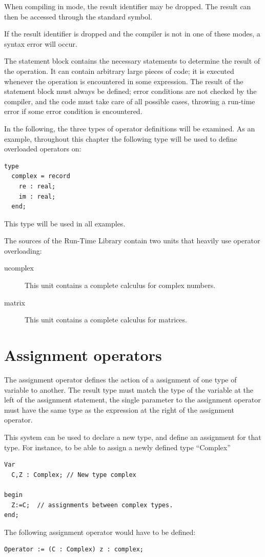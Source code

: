 \begin{remark}
When compiling in  mode, the result identifier may be dropped.
The result can then be accessed through the standard  symbol.

If the result identifier is dropped and the compiler is not in one
of these modes, a syntax error will occur.
\end{remark}


The statement block contains the necessary statements to determine the
result of the operation. It can contain arbitrary large pieces of code;
it is executed whenever the operation is encountered in some expression.
The result of the statement block must always be defined; error conditions
are not checked by the compiler, and the code must take care of all possible
cases, throwing a run-time error if some error condition is encountered.

In the following, the three types of operator definitions will be examined.
As an example, throughout this chapter the following type will be used to
define overloaded operators on:
\begin{verbatim}
type
  complex = record
    re : real;
    im : real;
  end;
\end{verbatim}
This type will be used in all examples.

The sources of the Run-Time Library contain two units that heavily use
operator overloading:
\begin{description}
\item[ucomplex] This unit contains a complete calculus for complex numbers.
\item[matrix] This unit contains a complete calculus for matrices.
\end{description}

\section{Assignment operators}
The assignment operator defines the action of a assignment of one type of
variable to another. The result type must match the type of the variable
at the left of the assignment statement, the single parameter to the
assignment operator must have the same type as the expression at the
right of the assignment operator.

This system can be used to declare a new type, and define an assignment for
that type. For instance, to be able to assign a newly defined type ``Complex''
\begin{verbatim}
Var
  C,Z : Complex; // New type complex

begin
  Z:=C;  // assignments between complex types.
end;
\end{verbatim}
The following assignment operator would have to be defined:
\begin{verbatim}
Operator := (C : Complex) z : complex;
\end{verbatim}

